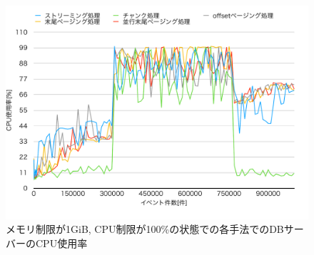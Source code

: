 \documentclass[../../../main]{subfiles}
\begin{document}
    \begin{figure}[H]
        \centering
        \includegraphics[width=12cm]{graph}
        \caption{メモリ制限が1GiB, CPU制限が100\%の状態での各手法でのDBサーバーのCPU使用率}
        \label{fig:db-cpu}
    \end{figure}
\end{document}
